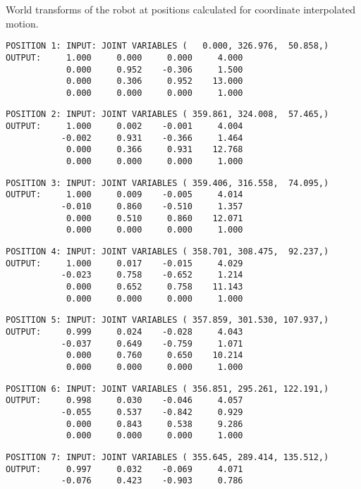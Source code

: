 \newpage
World transforms of the robot at positions calculated for coordinate interpolated motion.
\begin{verbatim}
POSITION 1: INPUT: JOINT VARIABLES (   0.000, 326.976,  50.858,)
OUTPUT:     1.000     0.000     0.000     4.000
            0.000     0.952    -0.306     1.500
            0.000     0.306     0.952    13.000
            0.000     0.000     0.000     1.000
\end{verbatim} \pagebreak[1]\begin{verbatim}
POSITION 2: INPUT: JOINT VARIABLES ( 359.861, 324.008,  57.465,)
OUTPUT:     1.000     0.002    -0.001     4.004
           -0.002     0.931    -0.366     1.464
            0.000     0.366     0.931    12.768
            0.000     0.000     0.000     1.000
\end{verbatim} \pagebreak[1]\begin{verbatim}
POSITION 3: INPUT: JOINT VARIABLES ( 359.406, 316.558,  74.095,)
OUTPUT:     1.000     0.009    -0.005     4.014
           -0.010     0.860    -0.510     1.357
            0.000     0.510     0.860    12.071
            0.000     0.000     0.000     1.000
\end{verbatim} \pagebreak[1]\begin{verbatim}
POSITION 4: INPUT: JOINT VARIABLES ( 358.701, 308.475,  92.237,)
OUTPUT:     1.000     0.017    -0.015     4.029
           -0.023     0.758    -0.652     1.214
            0.000     0.652     0.758    11.143
            0.000     0.000     0.000     1.000
\end{verbatim} \pagebreak[1]\begin{verbatim}
POSITION 5: INPUT: JOINT VARIABLES ( 357.859, 301.530, 107.937,)
OUTPUT:     0.999     0.024    -0.028     4.043
           -0.037     0.649    -0.759     1.071
            0.000     0.760     0.650    10.214
            0.000     0.000     0.000     1.000
\end{verbatim} \pagebreak[1]\begin{verbatim}
POSITION 6: INPUT: JOINT VARIABLES ( 356.851, 295.261, 122.191,)
OUTPUT:     0.998     0.030    -0.046     4.057
           -0.055     0.537    -0.842     0.929
            0.000     0.843     0.538     9.286
            0.000     0.000     0.000     1.000
\end{verbatim} \pagebreak[1]\begin{verbatim}
POSITION 7: INPUT: JOINT VARIABLES ( 355.645, 289.414, 135.512,)
OUTPUT:     0.997     0.032    -0.069     4.071
           -0.076     0.423    -0.903     0.786

\end{verbatim}
